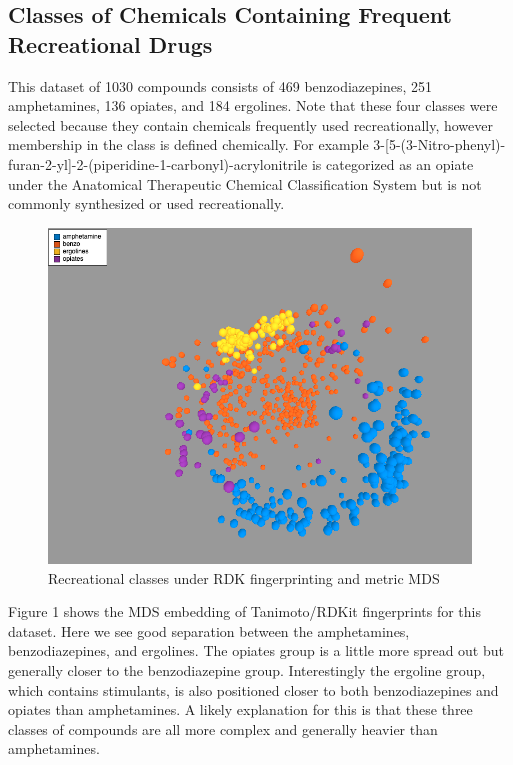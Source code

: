 \documentclass[12pt]{article}
\begin{document}
\subsection{Classes of Chemicals Containing Frequent Recreational Drugs}
This dataset of 1030 compounds consists of 469 benzodiazepines, 251 amphetamines, 136 opiates, and 184 ergolines. Note that these four classes were selected because they contain chemicals frequently used recreationally, however membership in the class is defined chemically. For example 3-[5-(3-Nitro-phenyl)-furan-2-yl]-2-(piperidine-1-carbonyl)-acrylonitrile is categorized as an opiate under the Anatomical Therapeutic Chemical Classification System but is not commonly synthesized or used recreationally.

\begin{figure}[H]
  \centering
  \includegraphics[width=\textwidth]{rec-rdk-mds}
  \captionsetup{justification=centering}
  \caption{Recreational classes under RDK fingerprinting and metric MDS}
\end{figure}

Figure 1 shows the MDS embedding of Tanimoto/RDKit fingerprints for this dataset.  Here we see good separation between the amphetamines, benzodiazepines,  and ergolines. The opiates group is a little more spread out but generally closer to the benzodiazepine group. Interestingly the ergoline group, which contains stimulants, is also positioned closer to both benzodiazepines and opiates than amphetamines. A likely explanation for this is that these three classes of compounds are all more complex and generally heavier than amphetamines.
\end{document}
